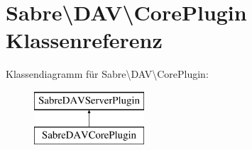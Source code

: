 \hypertarget{class_sabre_1_1_d_a_v_1_1_core_plugin}{}\section{Sabre\textbackslash{}D\+AV\textbackslash{}Core\+Plugin Klassenreferenz}
\label{class_sabre_1_1_d_a_v_1_1_core_plugin}
Klassendiagramm für Sabre\textbackslash{}D\+AV\textbackslash{}Core\+Plugin\+:\begin{figure}[H]
\begin{center}
\leavevmode
\includegraphics[height=2.000000cm]{class_sabre_1_1_d_a_v_1_1_core_plugin}
\end{center}
\end{figure}
